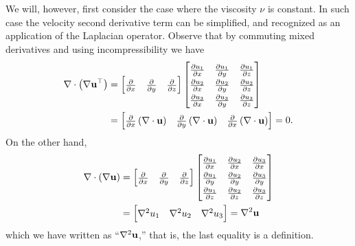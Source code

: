We will, however, first consider the case where the viscosity $\nu$ is constant.  In such case the velocity second derivative term can be simplified, and recognized as an application of the Laplacian operator.  Observe that by commuting mixed derivatives and using incompressibility we have
\begin{align*}
\Div \left(\grad \bu^{\top}\right) &= \renewcommand{\arraystretch}{1.3}\begin{bmatrix}
    \frac{\partial}{\partial x} & \frac{\partial}{\partial y} & \frac{\partial}{\partial z}
    \end{bmatrix}
    \begin{bmatrix}
    \frac{\partial u_1}{\partial x} & \frac{\partial u_1}{\partial y} & \frac{\partial u_1}{\partial z} \\
    \frac{\partial u_2}{\partial x} & \frac{\partial u_2}{\partial y} & \frac{\partial u_2}{\partial z} \\
    \frac{\partial u_3}{\partial x} & \frac{\partial u_3}{\partial y} & \frac{\partial u_3}{\partial z}
    \end{bmatrix} \\
  &= \begin{bmatrix}
    \frac{\partial}{\partial x}\left(\Div \bu\right) & \frac{\partial}{\partial y }\left(\Div \bu\right) & \frac{\partial}{\partial x} \left(\Div \bu\right)
    \end{bmatrix}
    = 0.
\end{align*}
On the other hand,
\begin{align*}
\Div \left(\grad \bu\right) &= \renewcommand{\arraystretch}{1.3}\begin{bmatrix}
    \frac{\partial}{\partial x} & \frac{\partial}{\partial y} & \frac{\partial}{\partial z}
    \end{bmatrix}
    \begin{bmatrix}
    \frac{\partial u_1}{\partial x} & \frac{\partial u_2}{\partial x} & \frac{\partial u_3}{\partial x} \\
    \frac{\partial u_1}{\partial y} & \frac{\partial u_2}{\partial y} & \frac{\partial u_3}{\partial y} \\
    \frac{\partial u_1}{\partial z} & \frac{\partial u_2}{\partial z} & \frac{\partial u_3}{\partial z}
    \end{bmatrix} \\
  &= \begin{bmatrix} \grad^2 u_1 & \grad^2 u_2 & \grad^2 u_3 \end{bmatrix} = \grad^2 \bu
\end{align*}
which we have written as ``$\nabla^2 \mathbf{u}$,'' that is, the last equality is a definition.  

